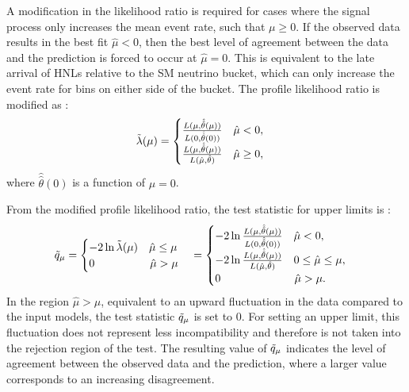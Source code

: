 A modification in the likelihood ratio is required for cases where the signal process only increases the mean event rate, such that $\mu \geq 0$.
If the observed data results in the best fit $\hat{\mu} < 0$, then the best level of agreement between the data and the prediction is forced to occur at $\hat{\mu} = 0$.
This is equivalent to the late arrival of HNLs relative to the SM neutrino bucket, which can only increase the event rate for bins on either side of the bucket.
The profile likelihood ratio is modified as \cite{asymptotic_test}:
\begin{equation}
    \Tilde{\lambda}(\mu) =
    \begin{cases}
        \frac{L(\mu, \hat{\hat{\theta}}(\mu) )}{L(0, \hat{\hat{\theta}} (0))}\ \ \ \hat{\mu} < 0, \\
        \frac{L(\mu, \hat{\hat{\theta}}(\mu) )}{L(\hat{\mu}, \hat{\theta})}\ \ \ \hat{\mu} \geq 0, \\
    \end{cases}
\end{equation}
where $\hat{\hat{\theta}} (0)$ is a function of $\mu = 0$. 

From the modified profile likelihood ratio, the test statistic for upper limits is \cite{asymptotic_test}:
\begin{equation}
    \Tilde{q}_\mu = 
    \begin{cases}
        -2\ln\Tilde{\lambda}(\mu)\ \ \ \hat{\mu} \leq \mu 
        \\
        0\ \ \ \ \ \ \ \ \ \ \  \ \ \ \ \hat{\mu} > \mu
    \end{cases}
    = 
    \begin{cases}
        -2\ln\frac{L(\mu, \hat{\hat{\theta}}(\mu) )}{L(0, \hat{\hat{\theta}} (0))}\ \ \ \hat{\mu} < 0, \\
        -2\ln\frac{L(\mu, \hat{\hat{\theta}}(\mu) )}{L(\hat{\mu}, \hat{\theta})}\ \ \ 0 \leq \hat{\mu} \leq \mu, \\
        0\ \ \ \ \ \ \ \ \ \ \ \ \ \ \ \ \ \ \ \ \hat{\mu} > \mu.
    \end{cases}
\end{equation}
In the region $\hat{\mu} > \mu$, equivalent to an upward fluctuation in the data compared to the input models, the test statistic $\Tilde{q}_\mu$ is set to 0.
For setting an upper limit, this fluctuation does not represent less incompatibility and therefore is not taken into the rejection region of the test.
The resulting value of $\Tilde{q}_\mu$ indicates the level of agreement between the observed data and the prediction, where a larger value corresponds to an increasing disagreement.

